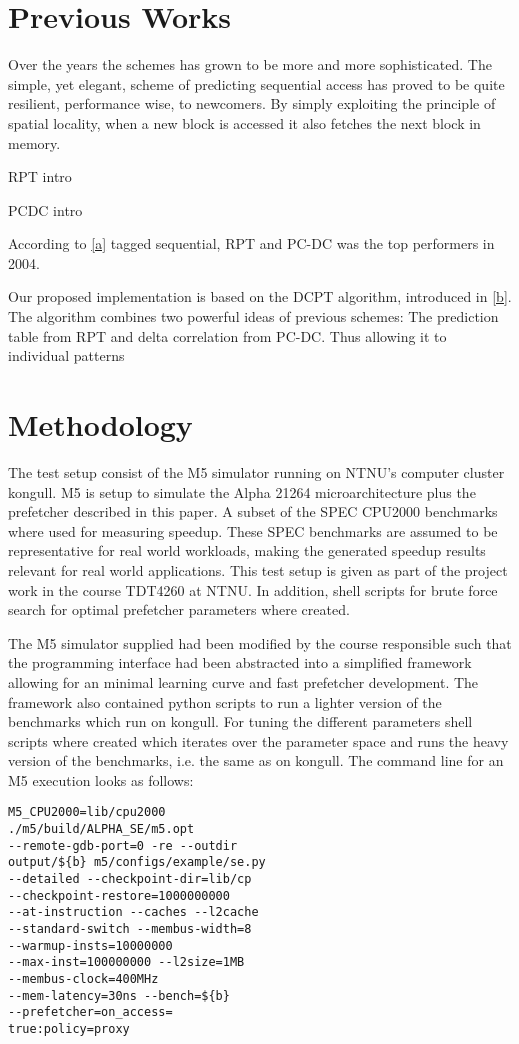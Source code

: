 \documentclass[12pt,journal,compsoc]{IEEEtran}
\begin{document}
\section{Previous Works}
Over the years the schemes has grown to be more and more sophisticated. The
simple, yet elegant, scheme of predicting sequential access has proved to be
quite resilient, performance wise, to newcomers. By simply exploiting the
principle of spatial locality, when a new block is accessed it also fetches 
the next block in memory.

RPT intro

PCDC intro

According to \ref{a} tagged sequential, RPT and PC-DC was the top performers in
2004.

Our proposed implementation is based on the DCPT algorithm, introduced in
\ref{b}. The algorithm combines two powerful ideas of previous schemes: The
prediction table from RPT and delta correlation from PC-DC. Thus allowing it to
individual patterns

\section{Methodology}
The test setup consist of the M5 simulator running on NTNU's computer
cluster kongull. M5 is setup to simulate the Alpha 21264 microarchitecture
plus the prefetcher described in this paper. A subset of the SPEC CPU2000
benchmarks where used for measuring speedup. These SPEC benchmarks are assumed
to be representative for real world workloads, making the generated speedup
results relevant for real world applications. This test setup is given
as part of the project work in the course TDT4260 at NTNU. In addition,
shell scripts for brute force search for optimal prefetcher parameters
where created.

The M5 simulator supplied had been modified by the course responsible such
that the programming interface had been abstracted into a simplified framework
allowing for an minimal learning curve and fast prefetcher development. The
framework also contained python scripts to run a lighter version of the
benchmarks which run on kongull. For tuning the different parameters shell
scripts where created which iterates over the parameter space and runs the
heavy version of the benchmarks, i.e. the same as on kongull. The command line
for an M5 execution looks as follows:

\begin{verbatim}
M5_CPU2000=lib/cpu2000
./m5/build/ALPHA_SE/m5.opt
--remote-gdb-port=0 -re --outdir
output/${b} m5/configs/example/se.py
--detailed --checkpoint-dir=lib/cp
--checkpoint-restore=1000000000
--at-instruction --caches --l2cache
--standard-switch --membus-width=8
--warmup-insts=10000000
--max-inst=100000000 --l2size=1MB
--membus-clock=400MHz
--mem-latency=30ns --bench=${b}
--prefetcher=on_access=
true:policy=proxy
\end{verbatim}
\end{document}
